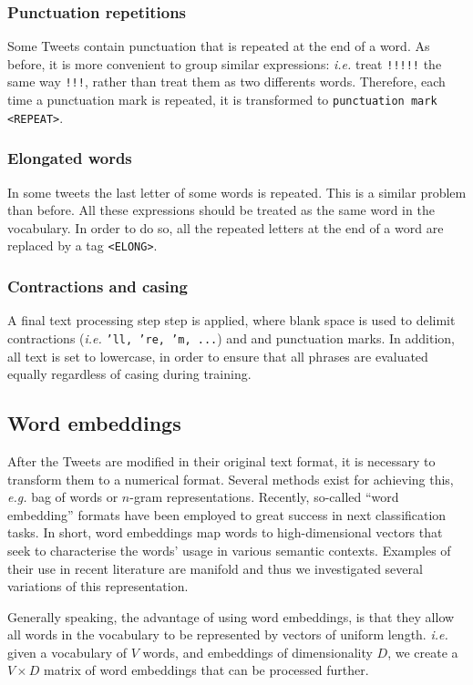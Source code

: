 \subsubsection{Punctuation repetitions}
Some Tweets contain punctuation that is repeated at the end of a word. As before, it is more convenient to group similar expressions: \emph{i.e.} treat \texttt{!!!!!} the same way \texttt{!!!}, rather than treat them as two differents words. Therefore, each time a punctuation mark is repeated, it is transformed to \texttt{punctuation mark <REPEAT>}. 

\subsubsection{Elongated words}
In some tweets the last letter of some words is repeated. This is a similar problem than before. All these expressions should be treated as the same word in the vocabulary. In order to do so, all the repeated letters at the end of a word are replaced by a tag \texttt{<ELONG>}.

\subsubsection{Contractions and casing}
A final text processing step step is applied, where blank space is used to delimit contractions (\emph{i.e.} \texttt{'ll, 're, 'm, ...}) and and punctuation marks. In addition, all text is set to lowercase, in order to ensure that all phrases are evaluated equally regardless of casing during training.

\subsection{Word embeddings}
After the Tweets are modified in their original text format, it is necessary to transform them to a numerical format. Several methods exist for achieving this, \emph{e.g.} bag of words or $n$-gram representations. Recently, so-called ``word embedding'' formats \cite{} have been employed to great success in next classification tasks. In short, word embeddings map words to high-dimensional vectors that seek to characterise the words' usage in various semantic contexts. \cite{} Examples of their use in recent literature are manifold \cite{} and thus we investigated several variations of this representation.

Generally speaking, the advantage of using word embeddings, is that they allow all words in the vocabulary to be represented by vectors of uniform length. \emph{i.e.} given a vocabulary of $V$ words, and embeddings of dimensionality $D$, we create a $V \times D$ matrix of word embeddings that can be processed further.

